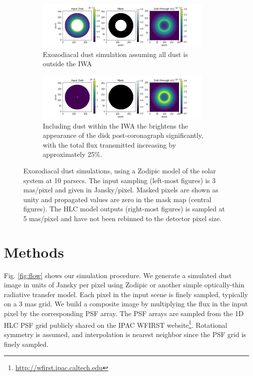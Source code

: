 \documentclass[]{spie}  %
\begin{document}
\begin{figure}[!ht]
    \centering
\begin{subfigure}{\textwidth}

    \includegraphics[width=0.95\textwidth]{masked_zodi.png}
    \caption{Exozodiacal dust simulation assuming all dust is outside the \gls{IWA} }
    \label{fig:mask}
    \end{subfigure}

\begin{subfigure}{\textwidth}
    \includegraphics[width=0.95\textwidth]{unmasked_zodi.png}
    \caption{Including dust within the \acrshort{IWA} the brightens the appearance of the disk post-coronagraph significantly, with the total flux transmitted increasing by approximately 25\%.}
    \label{fig:nomask}
    \end{subfigure}
 \caption{Exozodiacal dust simulations, using a Zodipic model of the solar system at 10 parsecs.
    The input sampling (left-most figures) is 3 mas/pixel and given in Jansky/pixel. Masked pixels are shown as unity and propagated values are zero in the mask map (central figures). The HLC model outputs (right-most figures) is sampled at 5 mas/pixel and have not been rebinned to the detector pixel size. }\label{fig:zodi_models}
\end{figure}


\section{Methods}
\label{sec:methods}  %
Fig. \ref{fig:flow} shows our simulation procedure. 
We generate a simulated dust image in units of Jansky per pixel using Zodipic\cite{kuchner_zodipic_2012} or another simple optically-thin radiative transfer model.
Each pixel in the input scene is finely sampled, typically on a 3 mas grid.  
We build a composite image by multiplying the flux in the input pixel by the corresponding PSF array.
The PSF arrays are sampled from the 1D \gls{HLC} \gls{PSF} grid publicly shared on the IPAC WFIRST  website\footnote{\url{http://wfirst.ipac.caltech.edu}}.
Rotational symmetry is assumed, and interpolation is  nearest neighbor since the \gls{PSF} grid is finely sampled.
\end{document}
